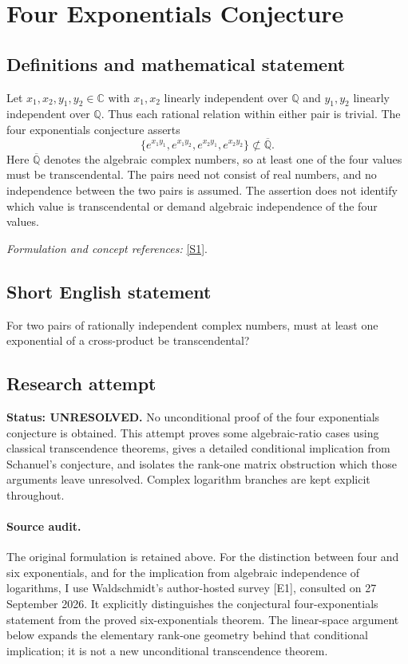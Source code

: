 \documentclass[11pt]{article}
\begin{document}
\section*{\texorpdfstring{Four Exponentials Conjecture}{Four Exponentials Conjecture}}\label{373}
\subsection{Definitions and mathematical statement}
Let $x_1,x_2,y_1,y_2\in{\mathbb{C}}$ with $x_1,x_2$ linearly independent over ${\mathbb{Q}}$ and $y_1,y_2$ linearly independent over ${\mathbb{Q}}$. Thus each rational relation within either pair is trivial. The four exponentials conjecture asserts
\[
 \{e^{x_1y_1},e^{x_1y_2},e^{x_2y_1},e^{x_2y_2}\}
 \not\subset\overline{{\mathbb{Q}}}.
\]
Here $\overline{{\mathbb{Q}}}$ denotes the algebraic complex numbers, so at least one of the four values must be transcendental. The pairs need not consist of real numbers, and no independence between the two pairs is assumed. The assertion does not identify which value is transcendental or demand algebraic independence of the four values.
\par\smallskip\textit{Formulation and concept references:} \href{https://mathworld.wolfram.com/FourExponentialsConjecture.html}{[S1]}.

\subsection{Short English statement}
For two pairs of rationally independent complex numbers, must at least one exponential of a cross-product be transcendental?
\subsection{Research attempt}
\textbf{Status: UNRESOLVED.} No unconditional proof of the four exponentials conjecture is obtained. This attempt proves some algebraic-ratio cases using classical transcendence theorems, gives a detailed conditional implication from Schanuel's conjecture, and isolates the rank-one matrix obstruction which those arguments leave unresolved. Complex logarithm branches are kept explicit throughout.

\paragraph{Source audit.}
The original formulation is retained above. For the distinction between four and six exponentials, and for the implication from algebraic independence of logarithms, I use Waldschmidt's author-hosted survey [E1], consulted on 27 September 2026. It explicitly distinguishes the conjectural four-exponentials statement from the proved six-exponentials theorem. The linear-space argument below expands the elementary rank-one geometry behind that conditional implication; it is not a new unconditional transcendence theorem.
\end{document}
